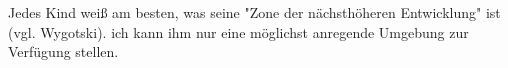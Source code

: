 Jedes Kind weiß am besten, was seine "Zone der nächsthöheren Entwicklung" ist (vgl. Wygotski).
ich kann ihm nur eine möglichst anregende Umgebung zur Verfügung stellen.